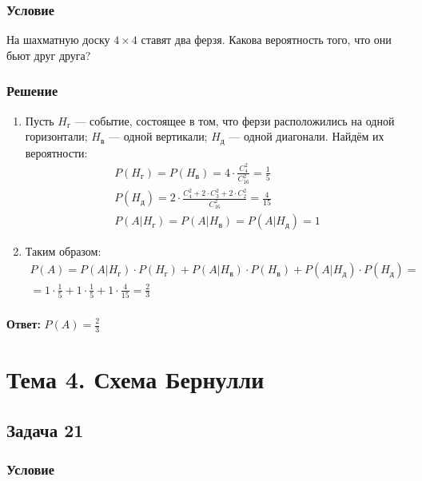 \documentclass[14pt]{article}
\begin{document}
    \subsubsection*{Условие}

    На шахматную доску $4 \times 4$ ставят два ферзя.
    Какова вероятность того, что они бьют друг друга?

    \subsubsection*{Решение}

    \begin{enumerate}[wide, labelwidth=!, labelindent=0pt]
        \item Пусть $H_г$ --- событие, состоящее в том, что ферзи расположились на одной горизонтали; $H_в$ --- одной вертикали; $H_д$ --- одной диагонали.
            Найдём их вероятности:
            \begin{gather*}
                P(H_г) = P(H_в) = 4 \cdot \frac{C_4^2}{C_{16}^2} = \frac{1}{5}\\
                P(H_д) = 2 \cdot \frac{C_4^2 + 2 \cdot C_3^2 + 2 \cdot C_2^2}{C_{16}^2} = \frac{4}{15}\\
                P(A|H_г) = P(A|H_в) = P(A|H_д) = 1
            \end{gather*}
        \item Таким образом:
            \begin{gather*}
                P(A) = P(A|H_г) \cdot P(H_г) + P(A|H_в) \cdot P(H_в) + P(A|H_д) \cdot P(H_д) =\\
                = 1 \cdot \frac{1}{5} + 1 \cdot \frac{1}{5} + 1 \cdot \frac{4}{15} = \frac{2}{3}\\
            \end{gather*}
    \end{enumerate}
    \hspace{290pt}\textbf{Ответ:} $P(A) = \frac{2}{3}$

    \section*{Тема 4. Схема Бернулли}

    \subsection*{Задача 21}
    \subsubsection*{Условие}
\end{document}
